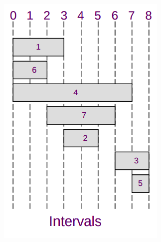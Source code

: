 \begin{figure}[H]
\begin{subfigure}[b]{0.19\textwidth}
		\includegraphics[width=\textwidth]{./Cap5/Images/Image12.png}
		\caption{}
		\label{fig:intervalsLE}
	\end{subfigure}
	\quad\quad\quad
	\begin{subfigure}[b]{0.2\textwidth}

\end{subfigure}
\end{figure}
